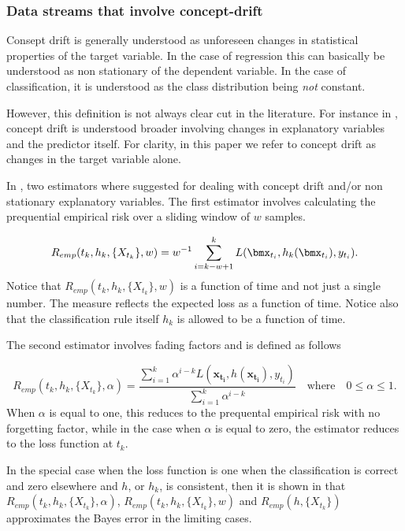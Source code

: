 \subsubsection{Data streams that involve concept-drift}

Consept drift is generally understood as unforeseen changes in statistical properties of the target variable.  In the case of regression this can basically be understood as non stationary of the dependent variable.  In the case of classification, it is understood as the class distribution being \emph{not} constant.  

However, this definition is not always clear cut in the literature.  For instance in \cite{Brz14}, concept drift is understood broader involving changes in explanatory variables and the predictor itself.    For clarity, in this paper we refer to concept drift as changes in the target variable alone.

In \cite{Gam13}, two estimators where suggested for dealing with concept drift and/or non stationary explanatory variables.  The first estimator involves calculating the prequential empirical risk over a sliding window of $w$ samples. 

\begin{equation}
\label{eq:prequentialRisk2}
R_{emp}(t_k, h_k, \{X_{t_k}\}, w) = w^{-1} \sum_{i=k - w +1}^k L(\bmx_{t_i} , h_k(\bmx_{t_i} ), y_{t_i}).
\end{equation}
Notice that $R_{emp}(t_k, h_k, \{X_{t_k}\}, w)$ is a function of time and not just a single number.  The measure reflects the expected loss as a function of time.  Notice also that the classification rule itself $h_k$ is allowed to be a function of time.

The second estimator involves fading factors and is defined as follows

\begin{equation}
\label{eq:prequentialRisk3}
R_{emp}(t_k, h_k, \{X_{t_k}\}, \alpha) =\frac{\sum_{i=1}^k \alpha^{i-k}L(\bm{x_{t_i}} , h(\bm{x_{t_i}} ), y_{t_i})}{\sum_{i=1}^k \alpha^{i-k}} \quad \mbox{where} \quad 0 \leq \alpha \leq 1.
\end{equation}
When $\alpha$ is equal to one, this reduces to the prequental empirical risk with no forgetting factor, while in the case when $\alpha$ is equal to zero, the estimator reduces to the loss function at $t_k$.

In the special case when the loss function is one when the classification is correct and zero elsewhere and $h$, or $h_k$, is consistent, then it is shown in \cite{Gam13} that 
$R_{emp}(t_k, h_k, \{X_{t_k}\}, \alpha)$, $R_{emp}(t_k, h_k, \{X_{t_k}\}, w) $ and $R_{emp}(h, \{X_{t_k}\})$ approximates the Bayes error in the limiting cases.



